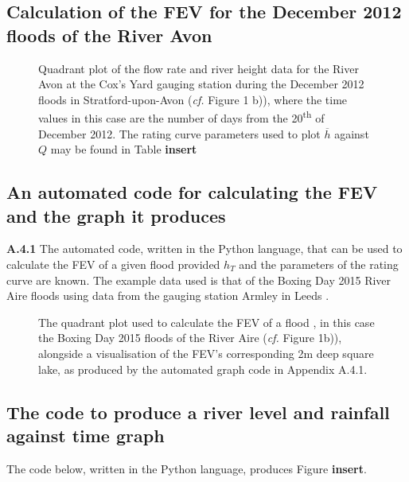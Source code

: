 \documentclass[11pt,a4paper]{article}
\begin{document}
\subsection{Calculation of the FEV for the December 2012 floods of the River Avon}
\begin{figure}[H]
\centering
{}
\caption{Quadrant plot of the flow rate and river height data for the River Avon at the Cox's Yard gauging station during the December 2012 floods in Stratford-upon-Avon (\textit{cf.} Figure 1 b)), where the time values in this case are the number of days from the 20\textsuperscript{th} of December 2012. The rating curve parameters used to plot $\overline{h}$ against $Q$ may be found in Table \textbf{insert}}
\end{figure}

\subsection{An automated code for calculating the FEV and the graph it produces}
\small{\noindent \textbf{A.4.1} The automated code, written in the Python language, that can be used to calculate the FEV of a given flood provided $h_T$ and the parameters of the rating curve are known. The example data used is that of the Boxing Day 2015 River Aire floods using data from the gauging station Armley in Leeds \cite{Aire}.}
\begin{spacing}{1}\footnotesize{}
\end{spacing}

\vspace{19cm}
\begin{figure}[H]
\begin{center}
\caption{The quadrant plot used to calculate the FEV of a flood , in this case the Boxing Day 2015 floods of the River Aire (\textit{cf.} Figure 1b)), alongside a visualisation of the FEV's corresponding 2m deep square lake, as produced by the automated graph code in Appendix A.4.1.}
\end{center}
\end{figure}

\subsection{The code to produce a river level and rainfall against time graph}
\small{\noindent The code below, written in the Python language, produces Figure \textbf{insert}.}
\begin{spacing}{1}\footnotesize{}
\end{spacing}
\end{document}
